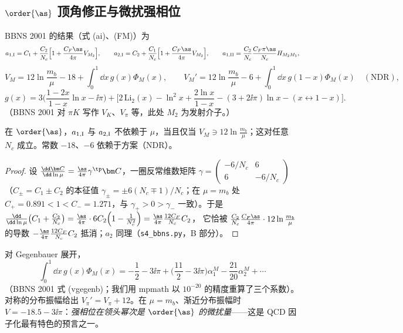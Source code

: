 \subsection{\texorpdfstring{$\order{\as}$}{O(as)} 顶角修正与微扰强相位}
BBNS 2001 的结果（式 (ai)、(FM)）为
\begin{equation}\label{eq:qcdf-ai}
a_{1,\rm I}=C_1+\frac{C_2}{N_c}\Big[1+\frac{C_F\as}{4\pi}V_{M_2}\Big],\qquad
a_{2,\rm I}=C_2+\frac{C_1}{N_c}\Big[1+\frac{C_F\as}{4\pi}V_{M_2}\Big],\qquad
a_{1,\rm II}=\frac{C_2}{N_c}\frac{C_F\pi\as}{N_c}H_{M_2M_1},
\end{equation}
\begin{equation}\label{eq:qcdf-VM}
V_M=12\ln\frac{m_b}{\mu}-18+\int_0^1\dd x\,g(x)\Phi_M(x),\qquad
V_M'=12\ln\frac{m_b}{\mu}-6+\int_0^1\dd x\,g(1-x)\Phi_M(x)\quad(\text{NDR}),
\end{equation}
\begin{equation}\label{eq:qcdf-g}
g(x)=3\Big(\frac{1-2x}{1-x}\ln x-\ii\pi\Big)+\Big[2\,\mathrm{Li}_2(x)-\ln^2x+\frac{2\ln x}{1-x}-(3+2\ii\pi)\ln x-(x\leftrightarrow1-x)\Big].
\end{equation}
（BBNS 2001 对 $\pi K$ 写作 $V_K$、$V_\pi$ 等，此处 $M_2$ 为发射介子。）

\begin{proposition}\tagR\label{prop:qcdf-log}
在 $\order{\as}$，$a_{1,\rm I}$ 与 $a_{2,\rm I}$ 不依赖于 $\mu$，当且仅当 $V_M\ni12\ln\frac{m_b}{\mu}$；这对任意 $N_c$ 成立。常数 $-18$、$-6$ 依赖于方案（NDR）。
\end{proposition}

\begin{proof}
设 $\frac{\dd\bm C}{\dd\ln\mu}=\frac{\as}{4\pi}\gamma^{\tp}\bm C$，一圈反常维数矩阵 $\gamma=\begin{pmatrix}-6/N_c&6\\6&-6/N_c\end{pmatrix}$
（$C_\pm=C_1\pm C_2$ 的本征值 $\gamma_\pm=\pm6(N_c\mp1)/N_c$；在 $\mu=m_b$ 处 $C_+=0.891<1<C_-=1.271$，与 $\gamma_+>0>\gamma_-$ 一致）。于是
$\frac{\dd}{\dd\ln\mu}\big(C_1+\frac{C_2}{N_c}\big)=\frac{\as}{4\pi}\cdot6C_2\Big(1-\frac1{N_c^2}\Big)=\frac{\as}{4\pi}\frac{12C_F}{N_c}C_2$，
它恰被 $\frac{C_2}{N_c}\frac{C_F\as}{4\pi}\cdot12\ln\frac{m_b}{\mu}$ 的导数 $-\frac{\as}{4\pi}\frac{12C_F}{N_c}C_2$ 抵消；$a_2$ 同理（\texttt{s4\_\allowbreak bbns.py}，B 部分）。
\end{proof}

对 Gegenbauer 展开，
\begin{equation}\label{eq:qcdf-vgegenb}
\int_0^1\dd x\,g(x)\Phi_M(x)=-\frac12-3\ii\pi+\Big(\frac{11}{2}-3\ii\pi\Big)\alpha_1^M-\frac{21}{20}\alpha_2^M+\cdots
\end{equation}
（BBNS 2001 式 (vgegenb)；我们用 mpmath 以 $10^{-20}$ 的精度重算了三个系数）。对称的分布振幅给出 $V_\pi'=V_\pi+12$。在 $\mu=m_b$、渐近分布振幅时
$V=-18.5-3\ii\pi$：\emph{强相位在领头幂次是 $\order{\as}$ 的微扰量}——这是 QCD 因子化最有特色的预言之一。

